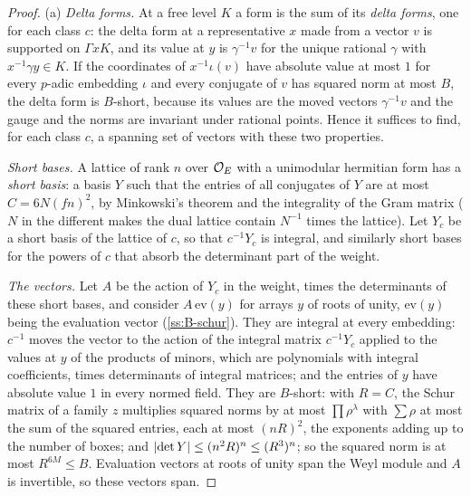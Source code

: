 \begin{proof}
(a) \emph{Delta forms.} At a free level $K$ a form is the sum of its \emph{delta forms}, one for each class $c$: the delta form at a representative $x$ made from a vector $v$ is supported on $\Gamma xK$, and its value at $y$ is $\gamma^{-1}v$ for the unique rational $\gamma$ with $x^{-1}\gamma y\in K$. If the coordinates of $x^{-1}\iota(v)$ have absolute value at most $1$ for every
$p$-adic embedding $\iota$ and every conjugate of $v$ has squared norm at most $B$, the delta form is $B$-short, because its values are the moved vectors $\gamma^{-1}v$ and the gauge and the norms are invariant under rational points. Hence it suffices to find, for each class $c$, a spanning set of vectors with these two properties.

\emph{Short bases.} A lattice of rank $n$ over $\mathcal{O}_E$ with a unimodular hermitian form has a \emph{short basis}: a basis $Y$ such that the entries of all conjugates of $Y$ are at most $C=6N(fn)^2$, by Minkowski's theorem and the integrality of the Gram matrix ($N$ in the different makes the dual lattice contain $N^{-1}$ times the lattice).
Let $Y_c$ be a short basis of the lattice of $c$, so that $c^{-1}Y_c$ is integral, and similarly short bases for the powers of $c$ that absorb the determinant part of the weight.

\emph{The vectors.} Let $A$ be the action of $Y_c$ in the weight, times the determinants of these short bases, and consider $A\,\mathrm{ev}(y)$ for arrays $y$ of roots of unity, $\mathrm{ev}(y)$ being the evaluation vector (\cref{ss:B-schur}). They are integral at every embedding: $c^{-1}$ moves the vector to the action of the integral matrix $c^{-1}Y_c$ applied to the values at $y$ of the products
of minors, which are polynomials with integral coefficients, times determinants of integral matrices; and the entries of $y$ have absolute value $1$ in every normed field. They are $B$-short: with $R=C$, the Schur matrix of a family $z$ multiplies squared norms by at most $\prod\rho^{\lambda}$ with $\sum\rho$ at most the sum of the squared entries, each at most $(nR)^2$, the exponents
adding up to the number of boxes; and $\lvert \det Y\rvert\le(n^2R)^n\le(R^3)^n$; so the squared norm is at most $R^{6M}\le B$. Evaluation vectors at roots of unity span the Weyl module and $A$ is invertible, so these vectors span.


\end{proof}
